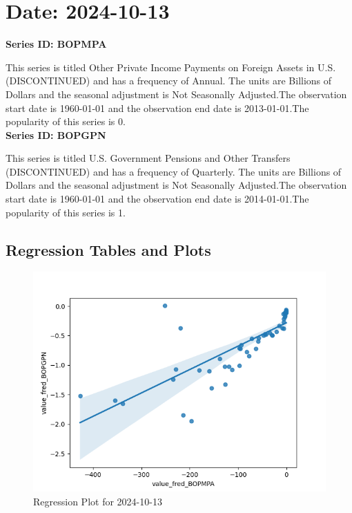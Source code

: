 \section{Date: 2024-10-13}
\noindent \textbf{Series ID: BOPMPA} 

\noindent This series is titled Other Private Income Payments on Foreign Assets in U.S. (DISCONTINUED) and has a frequency of Annual. The units are Billions of Dollars and the seasonal adjustment is Not Seasonally Adjusted.The observation start date is 1960-01-01 and the observation end date is 2013-01-01.The popularity of this series is 0. \\ 

\noindent \textbf{Series ID: BOPGPN} 

\noindent This series is titled U.S. Government Pensions and Other Transfers (DISCONTINUED) and has a frequency of Quarterly. The units are Billions of Dollars and the seasonal adjustment is Not Seasonally Adjusted.The observation start date is 1960-01-01 and the observation end date is 2014-01-01.The popularity of this series is 1. \\ 

\subsection{Regression Tables and Plots}


\begin{figure}
\centering
\includegraphics[scale = 0.9]{plots/plot_2024-10-13.png}
\caption{Regression Plot for 2024-10-13}
\end{figure}
\newpage
